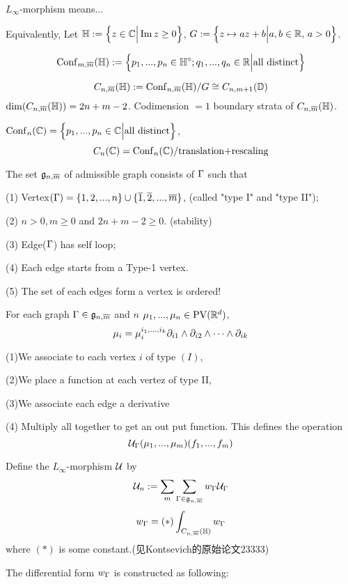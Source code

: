 $L_\infty$-morphism means...

Equivalently, Let $\mathbb{H}:=\Big\{ z\in\mathbb{C} \Big| \operatorname{Im} z\geq 0 \Big\}$,
$G:=\Big\{ z\mapsto az+b \Big| a,b\in\mathbb{R},\,a>0 \Big\}$.

$$
  \operatorname{Conf}_{m,\overline{m}}(\mathbb{H})
:=
  \Big\{ p_1,...,p_n\in\mathbb{H}^\circ;q_1,...,q_n\in\mathbb{R} \Big| \text{all distinct} \Big\}
$$

$$
  C_{n,\overline{m}}(\mathbb{H})
:=\operatorname{Conf}_{n,\overline{m}}(\mathbb{H})/G
\cong C_{n,m+1}(\mathbb{D})
$$
$\dim(C_{n,\overline{m}}(\mathbb{H}))=2n+m-2$. Codimension $=1$ boundary strata of
$C_{n,\overline{m}}(\mathbb{H})$.

$\operatorname{Conf}_n(\mathbb{C})=\Big\{ p_1,...,p_n\in\mathbb{C} \Big| \text{all distinct} \Big\}$,
$$C_n(\mathbb{C})=\operatorname{Conf}_n(\mathbb{C})/\text{translation$+$rescaling}$$

\begin{definition}The set $\mathfrak{g}_{n,\overline{m}}$ of admissible
graph consists of $\Gamma$ such that

(1) Vertex$(\Gamma)=\{1,2,...,n\}\cup\{\overline{1},\overline{2},...,\overline{m}\}$,
(called "type I" and "type II");

(2) $n>0,m\geq 0$ and $2n+m-2\geq 0$. (stability)

(3) Edge($\Gamma$) has self loop;

(4) Each edge starts from a Type-1 vertex.

(5) The set of each edges form a vertex is ordered!
\end{definition}

For each graph $\Gamma\in\mathfrak{g}_{n,\overline{m}}$ and $n$
$\mu_1,...,\mu_n\in\operatorname{PV}(\mathbb{R}^d)$,
$$\mu_i=\mu_i^{i_1,...,i_k}\partial_{i1}\wedge\partial_{i2}\wedge\cdots\wedge\partial_{ik}$$

(1)We associate to each vertex $i$ of type $(I)$,

(2)We place a function at each vertez of type II,

(3)We associate each edge a derivative

(4) Multiply all together to get an out put function.
This defines the operation
$$\mathcal{U}_{\Gamma}(\mu_1,...,\mu_m)(f_1,...,f_m)$$


Define the $L_\infty$-morphism $\mathcal{U}$ by
$$
  \mathcal{U}_n:=\sum_{m}\sum_{\Gamma\in\mathfrak{g}_{n,\overline{m}}}
  w_\Gamma\mathcal{U}_\Gamma
$$
$$
  w_{\Gamma}=(*)\int_{C_{n,\overline{m}}(\mathbb{H})}w_\Gamma
$$
where $(*)$ is some constant.(见Kontsevich的原始论文23333)

The differential form $w_\Gamma$ is constructed as following:

